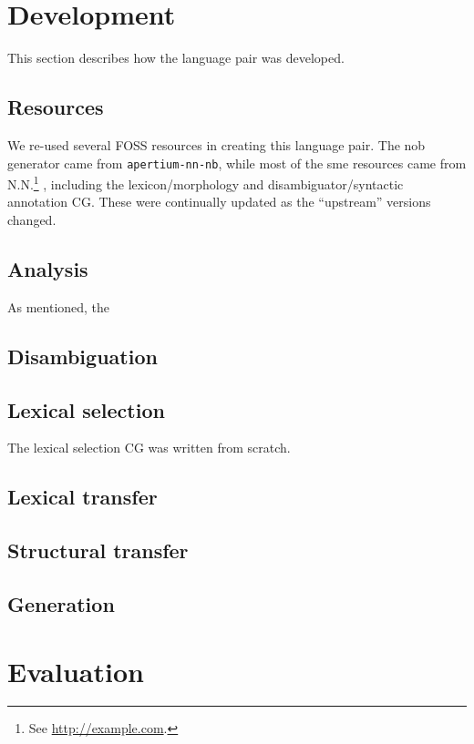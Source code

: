 \section{Development}
  \label{sec:development}

This section describes how the language pair was developed.
\subsection{Resources}
We re-used several FOSS resources in creating this language pair. The
nob generator came from {\tt apertium-nn-nb}\citep{unhammer2009rfr},
while most of the sme resources came from N.N.\footnote{See
  \href{http://example.com}{http://example.com}.} , including the
lexicon/morphology and disambiguator/syntactic annotation CG. These
were continually updated as the ``upstream'' versions changed.

\subsection{Analysis}
As mentioned, the 

\subsection{Disambiguation}
\subsection{Lexical selection}
The lexical selection CG was written from scratch.

\subsection{Lexical transfer}

\subsection{Structural transfer}
\label{sec:structural-transfer}

\subsection{Generation}

\section{Evaluation}
\label{sec:eval}



